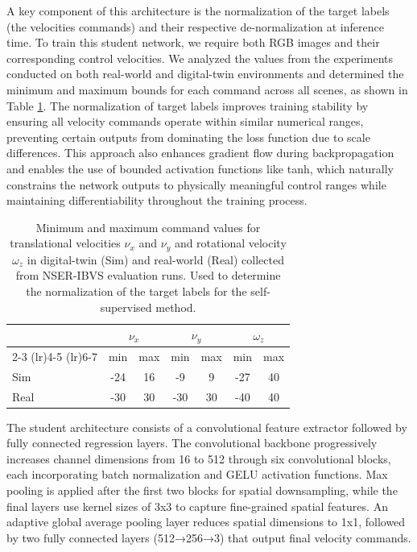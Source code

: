 \documentclass[10pt,twocolumn,letterpaper]{article}
\begin{document}
A key component of this architecture is the normalization of the target labels (the velocities commands) and their respective de-normalization at inference time. To train this student network, we require both RGB images and their corresponding control velocities. We analyzed the values from the experiments conducted on both real-world and digital-twin environments and determined the minimum and maximum bounds for each command across all scenes, as shown in Table \ref{tab:cmd-values}. The normalization of target labels improves training stability by ensuring all velocity commands operate within similar numerical ranges, preventing certain outputs from dominating the loss function due to scale differences. This approach also enhances gradient flow during backpropagation and enables the use of bounded activation functions like tanh, which naturally constrains the network outputs to physically meaningful control ranges while maintaining differentiability throughout the training process.

\begin{table}[h!]
    \centering
    \begin{tabular}{lcc|cc|cc}
        & \multicolumn{2}{c}{$\nu_{x}$} & \multicolumn{2}{c}{$\nu_{y}$} & \multicolumn{2}{c}{$\omega_{z}$} \\
        \cmidrule(lr){2-3} \cmidrule(lr){4-5} \cmidrule(lr){6-7}
        & min & max & min & max & min & max \\
        \hline
        Sim  & -24 & 16 & -9 & 9 & -27 & 40 \\
        Real & -30 & 30 & -30 & 30 & -40 & 40 \\
        \bottomrule
    \end{tabular}
    \caption{Minimum and maximum command values for translational velocities $\nu_{x}$ and $\nu_{y}$ and rotational velocity $\omega_{z}$ in digital-twin (Sim) and real-world (Real) collected from NSER-IBVS evaluation runs. Used to determine the normalization of the target labels for the self-supervised method.}
    \label{tab:cmd-values}
\end{table}

The student architecture consists of a convolutional feature extractor followed by fully connected regression layers. The convolutional backbone progressively increases channel dimensions from 16 to 512 through six convolutional blocks, each incorporating batch normalization and GELU activation functions. Max pooling is applied after the first two blocks for spatial downsampling, while the final layers use kernel sizes of 3x3 to capture fine-grained spatial features. An adaptive global average pooling layer reduces spatial dimensions to 1x1, followed by two fully connected layers (512→256→3) that output final velocity commands.
\end{document}
